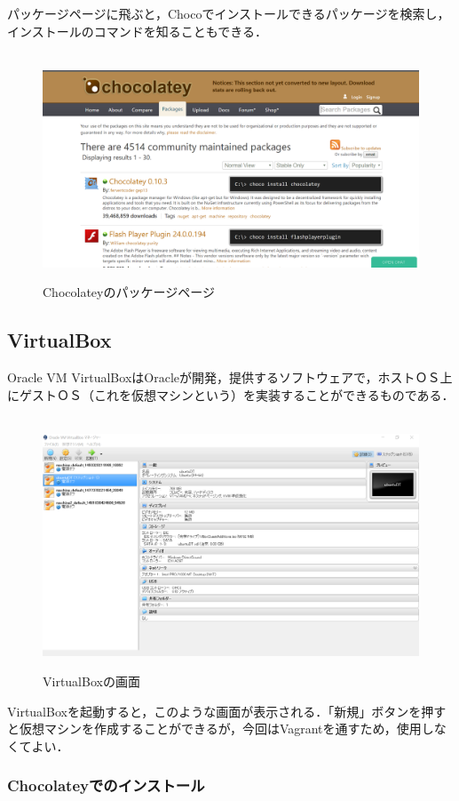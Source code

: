 パッケージページに飛ぶと，Chocoでインストールできるパッケージを検索し，インストールのコマンドを知ることもできる．
\begin{figure}[htbp]
\centering　
\includegraphics[width=13cm]{choco4.png}
\caption{Chocolateyのパッケージページ}
\end{figure}


\subsection{VirtualBox}

Oracle VM VirtualBoxはOracleが開発，提供するソフトウェアで，ホストＯＳ上にゲストＯＳ（これを仮想マシンという）を実装することができるものである．

\begin{figure}[htbp]
\centering　
\includegraphics[width=13cm]{VB.png}
\caption{VirtualBoxの画面}
\end{figure}

VirtualBoxを起動すると，このような画面が表示される．「新規」ボタンを押すと仮想マシンを作成することができるが，今回はVagrantを通すため，使用しなくてよい．

\subsubsection{Chocolateyでのインストール}

